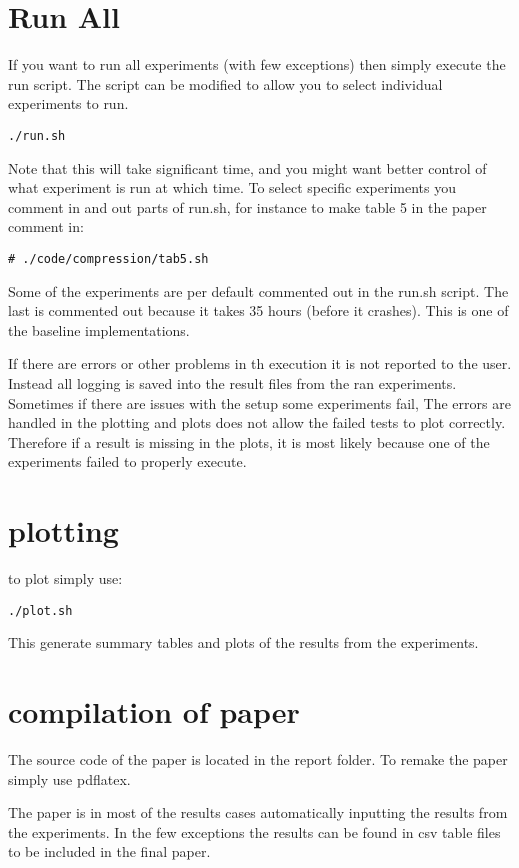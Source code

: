 \documentclass{readme}
\begin{document}
\section{Run All}

If you want to run all experiments (with few exceptions)
then simply execute the run script. The script can be modified
to allow you to select individual experiments to run.

\begin{lstlisting}
./run.sh
\end{lstlisting}

Note that this will take significant time, and you might want
better control of what experiment is run at which time.
To select specific experiments you comment in and out parts of
run.sh, for instance to make table 5 in the paper comment in:

\begin{lstlisting}
# ./code/compression/tab5.sh
\end{lstlisting}

Some of the experiments are per default commented out in the run.sh script.
The last is commented out because it takes 35 hours (before it crashes).
This is one of the baseline implementations.

If there are errors or other problems in th execution it is not reported
to the user. Instead all logging is saved into the result files from the
ran experiments. Sometimes if there are issues with the setup some
experiments fail, The errors are handled in the plotting and plots does
not allow the failed tests to plot correctly. Therefore if a result is
missing in the plots, it is most likely because one of the experiments
failed to properly execute.


\section{plotting}

to plot simply use:

\begin{lstlisting}
./plot.sh
\end{lstlisting}

This generate summary tables and plots of the results from the experiments.

\section{compilation of paper}

The source code of the paper is located in the report folder. To
remake the paper simply use pdflatex.

The paper is in most of the results cases automatically inputting
the results from the experiments. In the few exceptions the results can
be found in csv table files to be included in the final paper.
\end{document}
